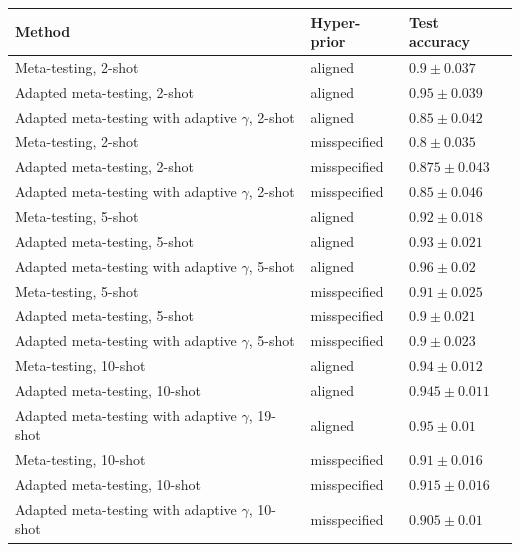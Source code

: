 \documentclass{article}
\theoremstyle{definition}
\begin{document}
\begin{table}	
	
	\centering
	\begin{tabular}{lll}
		\toprule
		Method   & Hyper-prior  & Test accuracy   \\
		\midrule
		Meta-testing, 2-shot & aligned   & $0.9\pm 0.037 $      \\
		Adapted meta-testing, 2-shot & aligned   & $0.95\pm 0.039$      \\
		Adapted meta-testing with adaptive $\gamma$, 2-shot & aligned   & $0.85\pm 0.042$      \\
		\midrule
		Meta-testing, 2-shot & misspecified   & $0.8\pm 0.035 $      \\
		Adapted meta-testing, 2-shot & misspecified   & $0.875\pm 0.043$      \\
		Adapted meta-testing with adaptive $\gamma$, 2-shot & misspecified   & $0.85\pm 0.046$    \\
		\midrule 
		
		Meta-testing, 5-shot & aligned   & $0.92\pm 0.018 $      \\
		Adapted meta-testing, 5-shot & aligned   & $0.93\pm 0.021$      \\
		Adapted meta-testing with adaptive $\gamma$, 5-shot & aligned   & $0.96\pm 0.02$      \\
		\midrule
		Meta-testing, 5-shot & misspecified   & $0.91\pm 0.025 $      \\
		Adapted meta-testing, 5-shot & misspecified   & $0.9\pm 0.021$      \\
		Adapted meta-testing with adaptive $\gamma$, 5-shot & misspecified   & $0.9\pm 0.023$ \\   
		\midrule
		
		Meta-testing, 10-shot & aligned   & $0.94\pm 0.012 $      \\
		Adapted meta-testing, 10-shot & aligned   & $0.945\pm 0.011$      \\
		Adapted meta-testing with adaptive $\gamma$, 19-shot & aligned   & $0.95\pm 0.01$      \\
		\midrule
		Meta-testing, 10-shot & misspecified   & $0.91\pm 0.016 $      \\
		Adapted meta-testing, 10-shot & misspecified   & $0.915\pm 0.016$      \\
		Adapted meta-testing with adaptive $\gamma$, 10-shot & misspecified   & $0.905\pm 0.01$    \\
		\midrule
		

\end{tabular}
\end{table}
\end{document}
